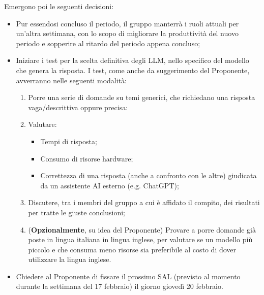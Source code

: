 Emergono poi le seguenti decisioni:
\begin{itemize}
\item Pur essendosi concluso il periodo, il gruppo manterrà i ruoli attuali per un'altra settimana,  con lo scopo di migliorare la produttività del nuovo periodo e sopperire al ritardo del periodo appena concluso;
\item Iniziare i test per la scelta definitiva degli LLM, nello specifico del modello che genera la risposta. I test, come anche da suggerimento del Proponente, avverranno nelle seguenti modalità:
    \begin{enumerate}
        \item Porre una serie di domande su temi generici, che richiedano una risposta vaga/descrittiva oppure precisa:
        \item Valutare:
            \begin{itemize}
                \item Tempi di risposta;
                \item Consumo di risorse hardware;
                \item Correttezza di una risposta (anche a confronto con le altre) giudicata da un assistente AI esterno (e.g. ChatGPT);
            \end{itemize}
       \item Discutere, tra i membri del gruppo a cui è affidato il compito, dei risultati per tratte le giuste conclusioni;    

       \item (\textbf{Opzionalmente}, su idea del Proponente) Provare a porre domande già poste in lingua italiana in lingua inglese, per valutare se un modello più piccolo e che consuma meno risorse sia preferibile al costo di dover utilizzare la lingua inglese.
    \end{enumerate}
\item Chiedere al Proponente di fissare il prossimo SAL (previsto al momento durante la settimana del 17 febbraio) il giorno giovedì 20 febbraio.

\end{itemize}